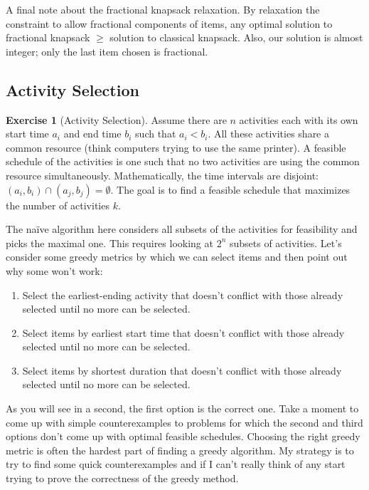 \documentclass[10pt]{article}
\theoremstyle{plain}
\theoremstyle{definition}
\newtheorem{exer}[thm]{Exercise}
\numberwithin{equation}{section}
\numberwithin{figure}{section}
\begin{document}
\noindent A final note about the fractional knapsack relaxation. By relaxation the constraint to allow fractional components of items, any optimal solution to fractional knapsack $\geq$ solution to classical knapsack. Also, our solution is almost integer; only the last item chosen is fractional. 

\subsection{Activity Selection}

\begin{exer}[Activity Selection]
Assume there are $n$ activities each with its own start time $a_i$ and end time $b_i$ such that $a_i < b_i$. All these activities share a common resource (think computers trying to use the same printer). A feasible schedule of the activities is one such that no two activities are using the common resource simultaneously. Mathematically, the time intervals are disjoint: $(a_i, b_i) \cap (a_j, b_j) = \emptyset$. The goal is to find a feasible schedule that maximizes the number of activities $k$.
\end{exer}

\noindent The na\"ive algorithm here considers all subsets of the activities for feasibility and picks the maximal one. This requires looking at $2^n$ subsets of activities. Let's consider some greedy metrics by which we can select items and then point out why some won't work:
\begin{enumerate}
\item Select the earliest-ending activity that doesn't conflict with those already selected until no more can be selected.
\item Select items by earliest start time that doesn't conflict with those already selected until no more can be selected.
\item Select items by shortest duration that doesn't conflict with those already selected until no more can be selected.
\end{enumerate}

\noindent As you will see in a second, the first option is the correct one. Take a moment to come up with simple counterexamples to problems for which the second and third options don't come up with optimal feasible schedules. Choosing the right greedy metric is often the hardest part of finding a greedy algorithm. My strategy is to try to find some quick counterexamples and if I can't really think of any start trying to prove the correctness of the greedy method. \\
\end{document}
